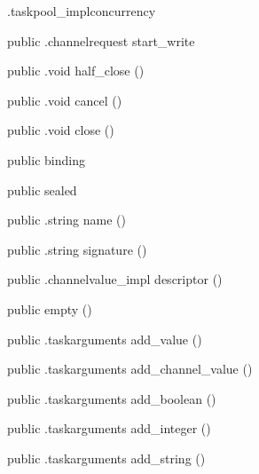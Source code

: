 \begin{CrexxClass}{.taskpool\_impl}{concurrency}
\begin{Members}
    \Method
      {public}
      {.channelrequest}
      {start\_write}
      {}

    \Method
      {public}
      {.void}
      {half\_close}
      {()}

    \Method
      {public}
      {.void}
      {cancel}
      {()}

    \Method
      {public}
      {.void}
      {close}
      {()}

    \Factory
      {public}
      {binding}
      {}

    \Factory
      {public}
      {sealed}
      {}

    \Method
      {public}
      {.string}
      {name}
      {()}

    \Method
      {public}
      {.string}
      {signature}
      {()}

    \Method
      {public}
      {.channelvalue\_impl}
      {descriptor}
      {()}

    \Factory
      {public}
      {empty}
      {()}

    \Method
      {public}
      {.taskarguments}
      {add\_value}
      {()}

    \Method
      {public}
      {.taskarguments}
      {add\_channel\_value}
      {()}

    \Method
      {public}
      {.taskarguments}
      {add\_boolean}
      {()}

    \Method
      {public}
      {.taskarguments}
      {add\_integer}
      {()}

    \Method
      {public}
      {.taskarguments}
      {add\_string}
      {()}


\end{Members}
\end{CrexxClass}
